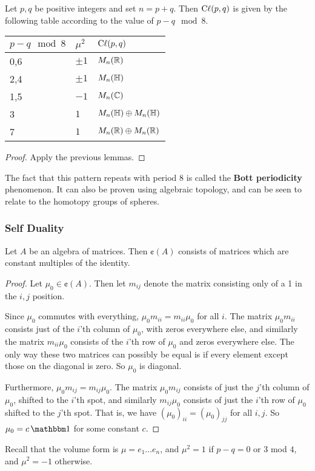 \begin{thm}
Let $p,q$ be positive integers and set $n=p+q$. Then $\operatorname{C\ell}(p,q)$ is given by the following table according to the value of $p-q\mod 8$.
\begin{center}
\begin{tabular}{lll}
$p-q\mod 8$ & $\mu^2$ & $\operatorname{C\ell}(p,q)$                \\ \hline
0,6         & $\pm1$  & $M_n(\operatorname{\mathbb{R}})$                \\
2,4         & $\pm 1$ & $M_n(\operatorname{\mathbb{H}})$                \\
1,5         & $-1$    & $M_n(\operatorname{\mathbb{C}})$                \\
3           & $1$     & $M_n(\operatorname{\mathbb{H}})\oplus M_n(\operatorname{\mathbb{H}})$ \\
7           & $1$     & $M_n(\operatorname{\mathbb{R}})\oplus M_n(\operatorname{\mathbb{R}})$
\end{tabular}
\end{center}
\end{thm}
\begin{proof}
Apply the previous lemmas.
\end{proof}
\begin{remark*}
    The fact that this pattern repeats with period $8$ is called the \textbf{Bott periodicity} phenomenon. It can also be proven using algebraic topology, and can be seen to relate to the homotopy groups of spheres.
\end{remark*}

\subsubsection{Self Duality}
\begin{lemma}
    Let $A$ be an algebra of matrices. Then $\cent(A)$ consists of matrices which are constant multiples of the identity.
\end{lemma}
\begin{proof}
    Let $\mu_0\in \cent(A)$. Then let $m_{ij}$ denote the matrix consisting only of a 1 in the $i,j$ position. 
    
    Since $\mu_0$ commutes with everything, $\mu_0 m_{ii} = m_{ii}\mu_0$ for all $i$. The matrix $\mu_0 m_{ii}$ consists just of the $i$'th column of $\mu_0$, with zeros everywhere else, and similarly the matrix $m_{ii}\mu_0$ consists of the $i$'th row of $\mu_0$ and zeros everywhere else. The only way these two matrices can possibly be equal is if every element except those on the diagonal is zero. So $\mu_0$ is diagonal.
    
    Furthermore, $\mu_0 m_{ij} = m_{ij}\mu_0$. The matrix $\mu_0 m_{ij}$ consists of just the $j$'th column of $\mu_0$, shifted to the $i$'th spot, and similarly $m_{ij}\mu_0$ consists of just the $i$'th row of $\mu_0$ shifted to the $j$'th spot. That is, we have $(\mu_0)_{ii} = (\mu_0)_{jj}$ for all $i,j$. So $\mu_0 = c\One$ for some constant $c$. 
\end{proof}
Recall that the volume form is $\mu = e_1...e_n$, and $\mu^2=1$ if $p-q=0$ or $3$ mod $4$, and $\mu^2=-1$ otherwise.

